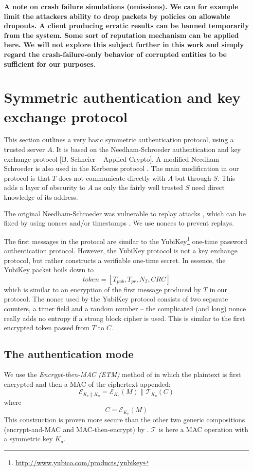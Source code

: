 \documentclass[10pt,a4paper]{article}
\begin{document}
\textbf{A note on crash failure simulations (omissions). We can for example limit the attackers ability to drop packets by policies on allowable dropouts. A client producing erratic results can be banned temporarily from the system. Some sort of reputation mechanism can be applied here. We will not explore this subject further in this work and simply regard the crash-failure-only behavior of corrupted entities to be sufficient for our purposes.}

\section{Symmetric authentication and key exchange protocol}

This section outlines a very basic symmetric authentication protocol, using a trusted server $A$. It is based on the Needham-Schroeder authentication and key exchange protocol  [B. Schneier -- Applied Crypto]. A modified Needham-Schroeder is also used in the Kerberos protocol . The main modification in our protocol is that $T$ does not communicate directly with $A$ but through $S$. This adds a layer of obscurity to $A$ as only the fairly well trusted $S$ need direct knowledge of its address.

The original Needham-Schroeder was vulnerable to replay attacks , which can be fixed by using nonces and/or timestamps \cite{needham1987}. We use nonces to prevent replays.

The first messages in the protocol are similar to the YubiKey\footnote{\url{http://www.yubico.com/products/yubikey}}  one-time password authentication protocol. However, the YubiKey protocol is not a key exchange protocol, but rather constructs a verifiable one-time secret. In essence, the YubiKey packet boils down to
\[
token = [T_{pub},T_{pr},N_T,CRC]
\]
which is similar to an encryption of the first message produced by $T$ in our protocol. The nonce used by the YubiKey protocol consists of two separate counters, a timer field and a random number -- the complicated (and long) nonce really adds no entropy if a strong block cipher is used. This is similar to the first encrypted token passed from $T$ to $C$.

\subsection{The authentication mode}

We use the \textit{Encrypt-then-MAC (ETM)} method of  in which the plaintext is first encrypted and then a MAC of the ciphertext appended:
\[
\mathcal{E}_{K_e \parallel K_a} = \mathcal{E}_{K_e}(M) \parallel \mathcal{T}_{K_a}(C)
\]
where
\[
C = \mathcal{E}_{K_e}(M)
\]
This construction is proven more secure than the other two generic compositions (encrypt-and-MAC and MAC-then-encrypt) by \citeauthor{bellare2007}. $ \mathcal{T}$ is here a MAC operation with a symmetric key $K_a$.
\end{document}
